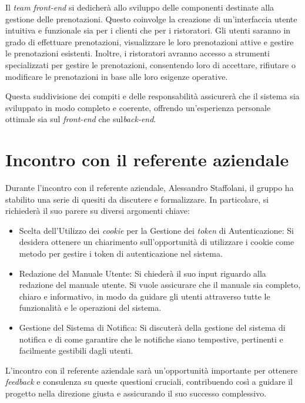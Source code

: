 Il \textit{team front-end} si dedicherà allo sviluppo delle componenti destinate alla gestione delle prenotazioni. 
Questo coinvolge la creazione di un'interfaccia utente intuitiva e funzionale sia per i clienti che per 
i ristoratori. Gli utenti saranno in grado di effettuare prenotazioni, visualizzare le loro prenotazioni 
attive e gestire le prenotazioni esistenti. Inoltre, i ristoratori avranno accesso a strumenti specializzati 
per gestire le prenotazioni, consentendo loro di accettare, rifiutare o modificare le prenotazioni in base 
alle loro esigenze operative.

Questa suddivisione dei compiti e delle responsabilità assicurerà che il sistema sia sviluppato in modo 
completo e coerente, offrendo un'esperienza personale ottimale sia sul \textit{front-end} che sul\textit{back-end}.



\section{Incontro con il referente aziendale}
Durante l'incontro con il referente aziendale, Alessandro Staffolani, il gruppo ha stabilito una serie di 
quesiti da discutere e formalizzare. In particolare, si richiederà il suo parere su diversi argomenti chiave:
\begin{itemize}
    \item Scelta dell'Utilizzo dei \textit{cookie} per la Gestione dei \textit{token} di Autenticazione: 
    Si desidera ottenere un chiarimento sull'opportunità di utilizzare i cookie come metodo per gestire i token di autenticazione nel sistema. 
    
    \item Redazione del Manuale Utente: 
    Si chiederà il suo input riguardo alla redazione del manuale utente. Si vuole assicurare che il manuale sia completo, chiaro e informativo, 
    in modo da guidare gli utenti attraverso tutte le funzionalità e le operazioni del sistema.

    \item Gestione del Sistema di Notifica: 
    Si discuterà della gestione del sistema di notifica e di come garantire che le notifiche siano tempestive, pertinenti e facilmente gestibili dagli utenti. 
\end{itemize}

L'incontro con il referente aziendale sarà un'opportunità importante per ottenere \textit{feedback} e consulenza su queste questioni cruciali, 
contribuendo così a guidare il progetto nella direzione giusta e assicurando il suo successo complessivo.
